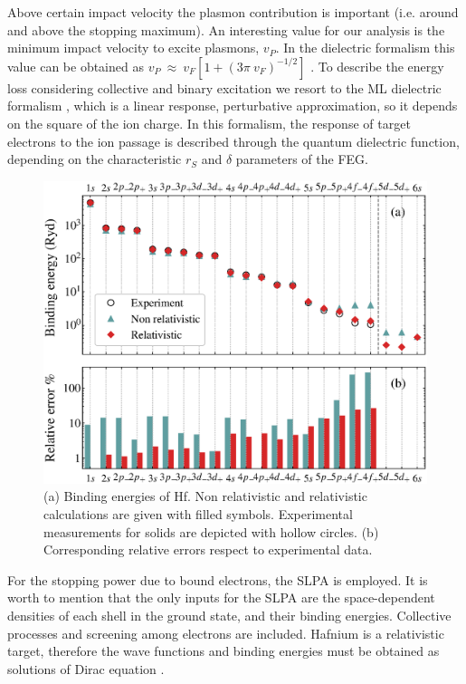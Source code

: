 \documentclass[aps,prb,reprint,groupedaddress]{revtex4-1}
\begin{document}
Above certain impact velocity the plasmon contribution is important (i.e. around and above the stopping maximum). An interesting value for our analysis is the minimum impact velocity to excite
plasmons, $v_P$. In the dielectric formalism this value can be obtained as $v_P\ \approx \ v_F[1+(3 \pi\ v_F)^{-1/2} ]$ \cite{suppression}. To describe the energy loss considering collective and binary excitation we resort to the ML dielectric formalism \cite{Mermin}, which is a linear response, perturbative approximation, so it depends on the square of the ion charge. In this formalism, the response of target electrons to the ion passage is described through the quantum dielectric function, depending on the characteristic $r_S$ and $\delta$ parameters of the FEG. 

\begin{figure}[!t]
\centering
\includegraphics[width=11.cm]{Hf_bindener_bar.eps}
\caption{(a) Binding energies of Hf. Non relativistic and relativistic calculations are given with filled symbols.  Experimental measurements for solids\cite{williams1995} are depicted with hollow circles. (b) Corresponding relative errors respect to experimental data.}
\label{Binding_E}
\end{figure}

For the stopping power due to bound electrons, the SLPA \cite{mon17,mon13} is employed. It is worth to mention that the only inputs for the SLPA are the space-dependent densities of each shell in the ground state, and their binding energies. Collective processes and screening among electrons are included. Hafnium is a relativistic target, therefore the wave functions and binding energies must be obtained as solutions of Dirac equation  \cite{mendez2019}.
\end{document}
